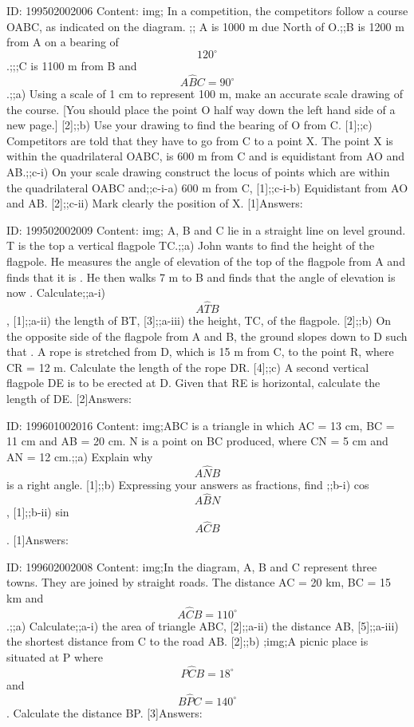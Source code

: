 \documentclass{article}
\begin{document}
ID: 199502002006
Content:
img; In a competition, the competitors follow a course OABC, as indicated on the diagram. ;; A is 1000 m due North of O.;;B is 1200 m from A on a bearing of $$120^{\circ}$$.;;;C is 1100 m from B and $$A \hat BC = 90^{\circ}$$.;;a) Using a scale of 1 cm to represent 100 m, make an accurate scale drawing of the course. [You should place the point O half way down the left hand side of a new page.] [2];;b) Use your drawing to find the bearing of O from C. [1];;c) Competitors are told that they have to go from C to a point X. The point X is within the quadrilateral OABC, is 600 m from C and is equidistant from AO and AB.;;c-i) On your scale drawing construct the locus of points which are within the quadrilateral OABC and;;c-i-a) 600 m from C, [1];;c-i-b) Equidistant from AO and AB. [2];;c-ii) Mark clearly the position of X. [1]Answers:

ID: 199502002009
Content:
img; A, B and C lie in a straight line on level ground. T is the top a vertical flagpole TC.;;a) John wants to find the height of the flagpole. He measures the angle of elevation of the top of the flagpole from A and finds that it is  . He then walks 7 m to B and finds that the angle of elevation is now  . Calculate;;a-i) $$A \hat TB$$, [1];;a-ii) the length of BT, [3];;a-iii) the height, TC, of the flagpole. [2];;b) On the opposite side of the flagpole from A and B, the ground slopes down to D such that . A rope is stretched from D, which is 15 m from C, to the point R, where CR = 12 m. Calculate the length of the rope DR. [4];;c) A second vertical flagpole DE is to be erected at D. Given that RE is horizontal, calculate the length of DE. [2]Answers:

ID: 199601002016
Content:
img;ABC is a triangle in which AC = 13 cm, BC = 11 cm and AB = 20 cm. N is a point on BC produced, where CN = 5 cm and AN = 12 cm.;;a) Explain why $$A \hat NB$$ is a right angle. [1];;b) Expressing your answers as fractions, find ;;b-i) cos $$A \hat BN$$, [1];;b-ii) sin $$A \hat CB$$. [1]Answers:

ID: 199602002008
Content:
img;In the diagram, A, B and C represent three towns. They are joined by straight roads. The distance AC = 20 km, BC = 15 km and $$A \hat CB = 110^{\circ}$$.;;a) Calculate;;a-i) the area of triangle ABC, [2];;a-ii) the distance AB, [5];;a-iii) the shortest distance from C to the road AB. [2];;b) ;img;A picnic place is situated at P where $$P \hat CB = 18^{\circ}$$ and $$B \hat PC = 140^{\circ}$$. Calculate the distance BP. [3]Answers:
\end{document}
